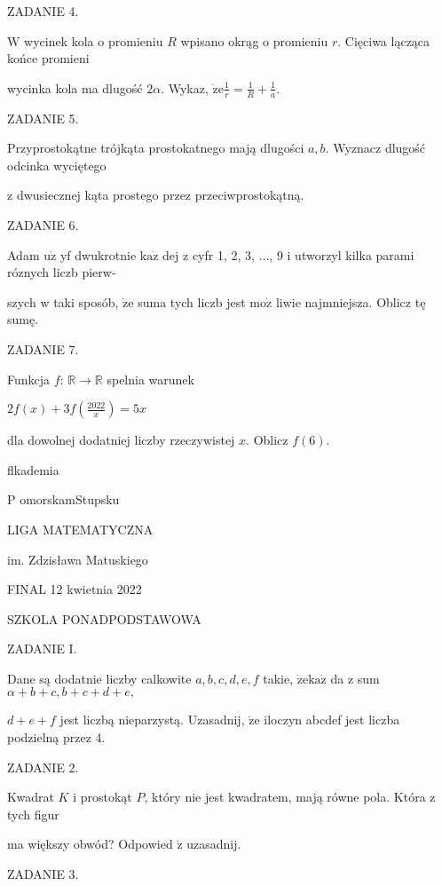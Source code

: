 \documentclass[a4paper,12pt]{article}
\begin{document}
ZADANIE 4.

$\mathrm{W}$ wycinek kola o promieniu $R$ wpisano okrąg o promieniu $r$. Cięciwa lącząca końce promieni

wycinka kola ma dlugość $ 2\alpha$. Wykaz, $\displaystyle \dot{\mathrm{z}}\mathrm{e}\frac{1}{r}=\frac{1}{R}+\frac{1}{a}.$

ZADANIE 5.

Przyprostokątne trójkąta prostokatnego mają dlugości $a, b$. Wyznacz dlugość odcinka wyciętego

z dwusiecznej kąta prostego przez przeciwprostokątną.

ZADANIE 6.

Adam $\mathrm{u}\dot{\mathrm{z}}$ yf dwukrotnie $\mathrm{k}\mathrm{a}\dot{\mathrm{z}}$ dej z cyfr 1, 2, 3, $\ldots$, 9 i utworzyl kilka parami róznych liczb pierw-

szych w taki sposób, $\dot{\mathrm{z}}\mathrm{e}$ suma tych liczb jest $\mathrm{m}\mathrm{o}\dot{\mathrm{z}}$ liwie najmniejsza. Oblicz tę sumę.

ZADANIE 7.

Funkcja $f$: $\mathbb{R}\rightarrow \mathbb{R}$ spelnia warunek

$2f(x)+3f(\displaystyle \frac{2022}{x})=5x$

dla dowolnej dodatniej liczby rzeczywistej $x$. Oblicz $f(6).$






flkademia

P omorskamStupsku

LIGA MATEMATYCZNA

im. Zdzisława Matuskiego

FINAL 12 kwietnia 2022

SZKOLA PONADPODSTAWOWA

ZADANIE I.

Dane są dodatnie liczby calkowite $a, b, c, d, e, f$ takie, $\dot{\mathrm{z}}\mathrm{e}\mathrm{k}\mathrm{a}\dot{\mathrm{z}}$ da z sum $\alpha+b+c, b+c+d+e,$

$d+e+f$ jest liczbą nieparzystą. Uzasadnij, $\dot{\mathrm{z}}\mathrm{e}$ iloczyn abcdef jest liczba podzielną przez 4.

ZADANIE 2.

Kwadrat $K$ i prostokąt $P$, który nie jest kwadratem, mają równe pola. Która z tych figur

ma większy obwód? Odpowied $\acute{\mathrm{z}}$ uzasadnij.

ZADANIE 3.
\end{document}
